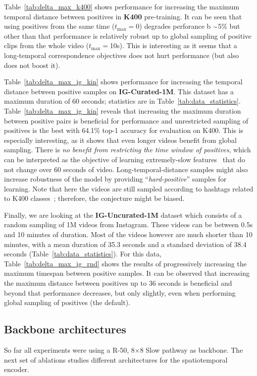 \documentclass[final]{cvpr}
\newcommand{\tblref}[1]{Table~\ref{#1}}
\newcommand{\app}{\raise.17ex\hbox{$\scriptstyle\sim$}}
\def\x{$\times$}
\begin{document}
	\tblref{tab:delta_max_k400} shows performance for increasing the maximum temporal distance between positives in \textbf{K400} pre-training. It can be seen that using positives from the same time ($t_\text{max}{=}$0) degrades perforance b $\app$5\% but other than that performance is relatively robust up to global sampling of positive clips from the whole video ($t_\text{max}{=}$10s). This is interesting as it seems that a long-temporal correspondence objectives does not hurt performance (but also does not boost it).
	
	\tblref{tab:delta_max_ig_kin} shows performance for increasing the temporal distance between positive samples on \textbf{IG-Curated-1M}. This dataset has a maximum duration of 60 seconds; statistics are in \tblref{tab:data_statistics}. \tblref{tab:delta_max_ig_kin} reveals that increasing the maximum duration between positive pairs is beneficial for performance and unrestricted sampling of positives is the best with 64.1\% top-1 accuracy for evaluation on K400. This is especially interesting, as it shows that even longer videos benefit from  global sampling. There is \textit{no benefit from restricting the time window of positives}, which can be interpreted as the objective of learning extremely-slow features~\cite{Wiskott02} that do not change over 60 seconds of video. Long-temporal-distance samples might also increase robustness of the model by providing ``\textit{hard-positive}'' samples for learning. Note that here the videos are still sampled according to hashtags related to K400 classes~\cite{Ghadiyaram2019}; therefore, the conjecture might be biased. 
	
	Finally, we are looking at the \textbf{IG-Uncurated-1M} dataset which consists of a random sampling of 1M videos from Instagram. These videos can be between 0.5s and 10 minutes of duration. Most of the videos however are much shorter than 10 minutes, with a mean duration of 35.3 seconds and a standard deviation of 38.4 seconds (\tblref{tab:data_statistics}). For this data, \tblref{tab:delta_max_ig_rnd} shows the results of progressively increasing the maximum timespan between positive samples. It can be observed that increasing the maximum distance between positives up to 36 seconds is beneficial and beyond that performance decreases, but only slightly, even when performing global sampling of positives (the default).
		
	\subsection{Backbone architectures} \label{sef:backbones}
		So far all experiments were using a R-50, 8\x8 Slow pathway \cite{He16,Feichtenhofer19} as backbone. The next set of ablations studies different architectures for the spatiotemporal encoder.
		
\end{document}
